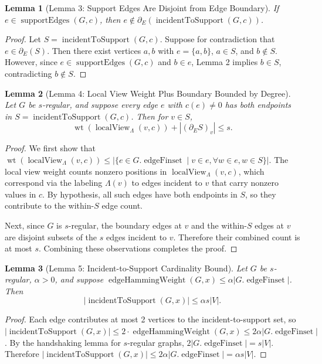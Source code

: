 \documentclass[11pt]{article}
\theoremstyle{plain}
\newtheorem*{lemma}{Lemma}
\theoremstyle{definition}
\theoremstyle{remark}
\begin{document}
\begin{lemma}[Lemma 3: Support Edges Are Disjoint from Edge Boundary]
If $e \in \operatorname{supportEdges}(G, c)$, then $e \notin \partial_E(\operatorname{incidentToSupport}(G, c))$.
\end{lemma}

\begin{proof}
Let $S = \operatorname{incidentToSupport}(G, c)$. Suppose for contradiction that $e \in \partial_E(S)$. Then there exist vertices $a, b$ with $e = \{a, b\}$, $a \in S$, and $b \notin S$. However, since $e \in \operatorname{supportEdges}(G, c)$ and $b \in e$, Lemma 2 implies $b \in S$, contradicting $b \notin S$.
\end{proof}

\begin{lemma}[Lemma 4: Local View Weight Plus Boundary Bounded by Degree]
Let $G$ be $s$-regular, and suppose every edge $e$ with $c(e) \neq 0$ has both endpoints in $S = \operatorname{incidentToSupport}(G, c)$. Then for $v \in S$,
\[
\operatorname{wt}(\operatorname{localView}_\Lambda(v, c)) + |(\partial_E S)_v| \leq s.
\]
\end{lemma}

\begin{proof}
We first show that $\operatorname{wt}(\operatorname{localView}_\Lambda(v, c)) \leq |\{e \in G.\operatorname{edgeFinset} \mid v \in e, \forall w \in e, w \in S\}|$. The local view weight counts nonzero positions in $\operatorname{localView}_\Lambda(v, c)$, which correspond via the labeling $\Lambda(v)$ to edges incident to $v$ that carry nonzero values in $c$. By hypothesis, all such edges have both endpoints in $S$, so they contribute to the within-$S$ edge count.

Next, since $G$ is $s$-regular, the boundary edges at $v$ and the within-$S$ edges at $v$ are disjoint subsets of the $s$ edges incident to $v$. Therefore their combined count is at most $s$. Combining these observations completes the proof.
\end{proof}

\begin{lemma}[Lemma 5: Incident-to-Support Cardinality Bound]
Let $G$ be $s$-regular, $\alpha > 0$, and suppose $\operatorname{edgeHammingWeight}(G, x) \leq \alpha |G.\operatorname{edgeFinset}|$. Then
\[
|\operatorname{incidentToSupport}(G, x)| \leq \alpha s |V|.
\]
\end{lemma}

\begin{proof}
Each edge contributes at most 2 vertices to the incident-to-support set, so $|\operatorname{incidentToSupport}(G, x)| \leq 2 \cdot \operatorname{edgeHammingWeight}(G, x) \leq 2\alpha |G.\operatorname{edgeFinset}|$. By the handshaking lemma for $s$-regular graphs, $2|G.\operatorname{edgeFinset}| = s|V|$. Therefore $|\operatorname{incidentToSupport}(G, x)| \leq 2\alpha |G.\operatorname{edgeFinset}| = \alpha s |V|$.
\end{proof}
\end{document}
